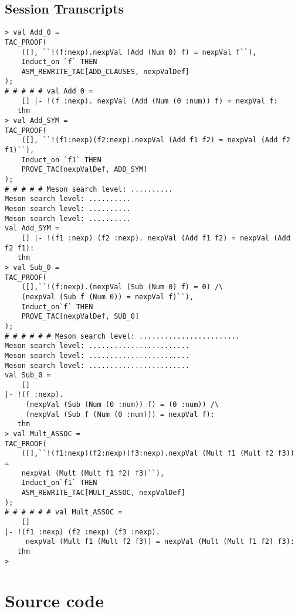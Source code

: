 \documentclass{report}
\begin{document}
\section{Session Transcripts}
\label{trans-11-6-3}
\begin{session}
  \begin{scriptsize}
\begin{verbatim}
> val Add_0 =
TAC_PROOF(
	([], ``!(f:nexp).nexpVal (Add (Num 0) f) = nexpVal f``),
	Induct_on `f` THEN
	ASM_REWRITE_TAC[ADD_CLAUSES, nexpValDef]
);
# # # # # val Add_0 =
    [] |- !(f :nexp). nexpVal (Add (Num (0 :num)) f) = nexpVal f:
   thm
> val Add_SYM =
TAC_PROOF(
	([], ``!(f1:nexp)(f2:nexp).nexpVal (Add f1 f2) = nexpVal (Add f2 f1)``),
	Induct_on `f1` THEN
	PROVE_TAC[nexpValDef, ADD_SYM]
);
# # # # # Meson search level: ..........
Meson search level: ..........
Meson search level: ..........
Meson search level: ..........
val Add_SYM =
    [] |- !(f1 :nexp) (f2 :nexp). nexpVal (Add f1 f2) = nexpVal (Add f2 f1):
   thm
> val Sub_0 =
TAC_PROOF(
	([],``!(f:nexp).(nexpVal (Sub (Num 0) f) = 0) /\
	(nexpVal (Sub f (Num 0)) = nexpVal f)``),
	Induct_on`f` THEN
	PROVE_TAC[nexpValDef, SUB_0]
);
# # # # # # Meson search level: ........................
Meson search level: ........................
Meson search level: ........................
Meson search level: ........................
val Sub_0 =
    []
|- !(f :nexp).
     (nexpVal (Sub (Num (0 :num)) f) = (0 :num)) /\
     (nexpVal (Sub f (Num (0 :num))) = nexpVal f):
   thm
> val Mult_ASSOC =
TAC_PROOF(
	([],``!(f1:nexp)(f2:nexp)(f3:nexp).nexpVal (Mult f1 (Mult f2 f3)) =
	nexpVal (Mult (Mult f1 f2) f3)``),
	Induct_on`f1` THEN
	ASM_REWRITE_TAC[MULT_ASSOC, nexpValDef]
);
# # # # # # val Mult_ASSOC =
    []
|- !(f1 :nexp) (f2 :nexp) (f3 :nexp).
     nexpVal (Mult f1 (Mult f2 f3)) = nexpVal (Mult (Mult f1 f2) f3):
   thm
> 
\end{verbatim}
  \end{scriptsize}
\end{session}

\appendix{}

\chapter{Source code}
\label{cha:source-code}



\end{document}
